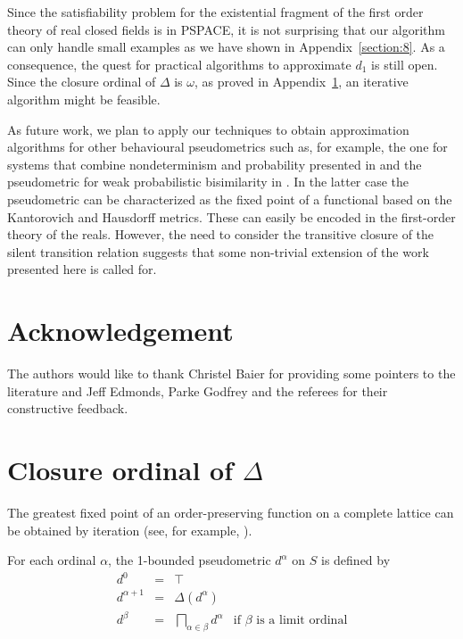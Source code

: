\documentclass{LMCS}
\begin{document}
Since the satisfiability
problem for the existential fragment of the first order theory of
real closed fields is in \textsc{PSPACE}, it is not surprising that
our algorithm can only handle small examples as we have shown in
Appendix~\ref{section:8}.  As a consequence, the quest for practical
algorithms to approximate $d_1$ is still open.  Since the closure
ordinal of $\Delta$ is $\omega$, as proved in
Appendix~\ref{section:added}, an iterative algorithm might be feasible.

As future work, we plan to apply our techniques to obtain
approximation algorithms for other behavioural pseudometrics such as,
for example, the one for systems that combine nondeterminism and
probability presented in \cite{DCPP05:qapl} and the pseudometric for
weak probabilistic bisimilarity in \cite{DGJP02:lics}.  In the latter
case the pseudometric can be characterized as the fixed point of a
functional based on the Kantorovich and Hausdorff metrics.  These can
easily be encoded in the first-order theory of the reals.  However, the
need to consider the transitive closure of the silent transition relation
suggests that some non-trivial extension of the work presented here is
called for.

\section*{Acknowledgement}

The authors would like to thank Christel Baier for providing
some pointers to the literature and Jeff Edmonds, Parke Godfrey
and the referees for their constructive feedback.




\appendix

\section{Closure ordinal of $\Delta$}
\label{section:added}

The greatest fixed point of an order-preserving function on a complete lattice
can be obtained by iteration (see, for example, \cite[Exercise~4.13]{DP90}).

\begin{defi}
For each ordinal $\alpha$, the 1-bounded pseudometric $d^{\alpha}$ on $S$
is defined by
\begin{displaymath}
\begin{array}{rcll}
d^0 & = & \top\\
d^{\alpha + 1} & = & \Delta(d^{\alpha})\\
d^{\beta} & = & {\displaystyle \bigsqcap_{\alpha \in \beta} d^{\alpha}} & \mbox{if $\beta$ is a limit ordinal}
\end{array}
\end{displaymath}
\end{defi}
\end{document}
